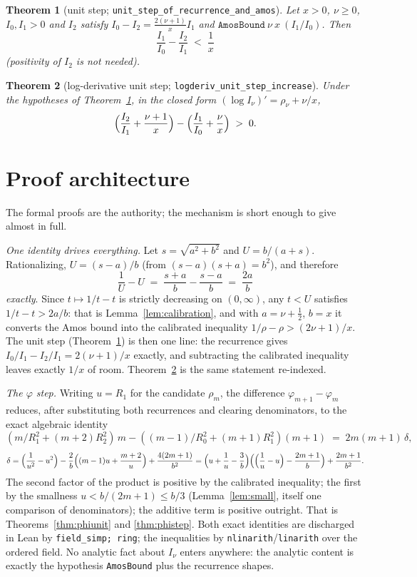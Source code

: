 \documentclass[11pt]{article}
\newtheorem{theorem}{Theorem}[section]
\newcommand{\lean}[1]{\texttt{#1}}
\begin{document}
\begin{theorem}[unit step;
\lean{unit\_step\_of\_recurrence\_and\_amos}]\label{thm:unitstep}
Let $x > 0$, $\nu \ge 0$, $I_0, I_1 > 0$ and $I_2$ satisfy
$I_0 - I_2 = \tfrac{2(\nu+1)}{x} I_1$ and
$\lean{AmosBound}\ \nu\ x\ (I_1/I_0)$.  Then
\[
\frac{I_1}{I_0} - \frac{I_2}{I_1} \;<\; \frac{1}{x}
\]
(positivity of $I_2$ is not needed).
\end{theorem}

\begin{theorem}[log-derivative unit step;
\lean{logderiv\_unit\_step\_increase}]\label{thm:logd}
Under the hypotheses of Theorem~\ref{thm:unitstep}, in the closed
form $(\log I_\nu)' = \rho_\nu + \nu/x$,
\[
\Bigl(\frac{I_2}{I_1} + \frac{\nu+1}{x}\Bigr)
- \Bigl(\frac{I_1}{I_0} + \frac{\nu}{x}\Bigr) \;>\; 0 .
\]
\end{theorem}

\section{Proof architecture}\label{sec:architecture}

The formal proofs are the authority; the mechanism is short enough to
give almost in full.

\emph{One identity drives everything.}  Let $s = \sqrt{a^2+b^2}$ and
$U = b/(a+s)$.  Rationalizing, $U = (s-a)/b$ (from
$(s-a)(s+a) = b^2$), and therefore
\[
\frac{1}{U} - U \;=\; \frac{s+a}{b} - \frac{s-a}{b} \;=\; \frac{2a}{b}
\]
\emph{exactly}.  Since $t \mapsto 1/t - t$ is strictly decreasing on
$(0,\infty)$, any $t < U$ satisfies $1/t - t > 2a/b$: that is
Lemma~\ref{lem:calibration}, and with $a = \nu + \tfrac12$, $b = x$
it converts the Amos bound into the calibrated inequality
$1/\rho - \rho > (2\nu+1)/x$.  The unit step
(Theorem~\ref{thm:unitstep}) is then one line: the recurrence gives
$I_0/I_1 - I_2/I_1 = 2(\nu+1)/x$ exactly, and subtracting the
calibrated inequality leaves exactly $1/x$ of room.
Theorem~\ref{thm:logd} is the same statement re-indexed.

\emph{The $\varphi$ step.}  Writing $u = R_1$ for the candidate
$\rho_m$, the difference $\varphi_{m+1} - \varphi_m$ reduces, after
substituting both recurrences and clearing denominators, to the exact
algebraic identity
\[
(m/R_1^2 + (m+2)R_2^2)\,m - ((m-1)/R_0^2 + (m+1)R_1^2)(m+1)
\;=\; 2m(m+1)\,\delta,
\]
\[
\delta
= \Bigl(\frac1{u^2} - u^2\Bigr)
- \frac2b\Bigl((m-1)u + \frac{m+2}{u}\Bigr) + \frac{4(2m+1)}{b^2}
= \Bigl(u + \frac1u - \frac3b\Bigr)
  \Bigl(\Bigl(\frac1u - u\Bigr) - \frac{2m+1}{b}\Bigr)
+ \frac{2m+1}{b^2}.
\]
The second factor of the product is positive by the calibrated
inequality; the first by the smallness $u < b/(2m+1) \le b/3$
(Lemma~\ref{lem:small}, itself one comparison of denominators); the
additive term is positive outright.  That is
Theorems~\ref{thm:phiunit} and \ref{thm:phistep}.  Both exact
identities are discharged in Lean by \lean{field\_simp; ring}; the
inequalities by \lean{nlinarith}/\lean{linarith} over the ordered
field.  No analytic fact about $I_\nu$ enters anywhere: the analytic
content is exactly the hypothesis \lean{AmosBound} plus the
recurrence shapes.
\end{document}
